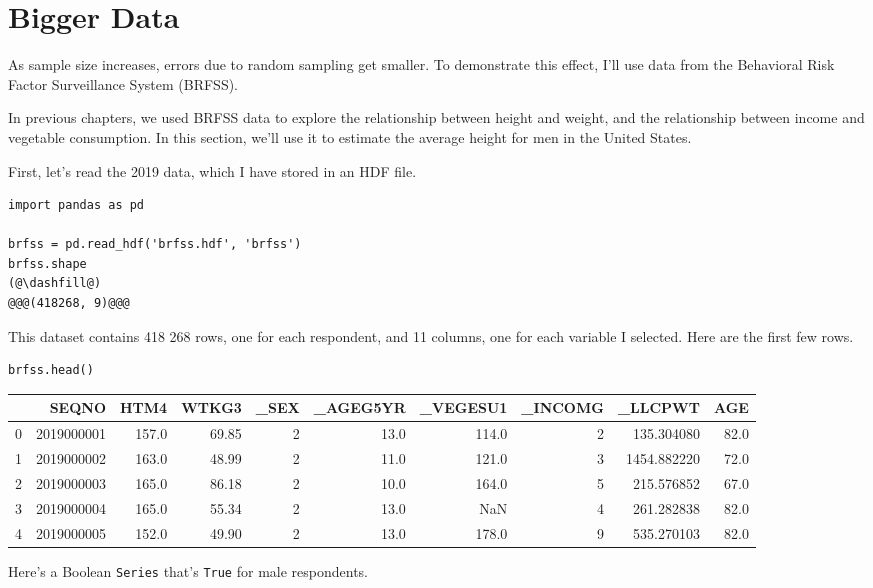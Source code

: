 \hypertarget{bigger-data}{%
\section{Bigger Data}\label{bigger-data}}

As sample size increases, errors due to random sampling get smaller. To
demonstrate this effect, I'll use data from the Behavioral Risk Factor
Surveillance System (BRFSS).

In previous chapters, we used BRFSS data to explore the relationship
between height and weight, and the relationship between income and
vegetable consumption. In this section, we'll use it to estimate the
average height for men in the United States.

First, let's read the 2019 data, which I have stored in an HDF file.

\begin{lstlisting}[]
import pandas as pd

brfss = pd.read_hdf('brfss.hdf', 'brfss')
brfss.shape
(@\dashfill@)
@@@(418268, 9)@@@
\end{lstlisting}

This dataset contains 418 268 rows, one for each respondent, and 11
columns, one for each variable I selected. Here are the first few rows.

\begin{lstlisting}[]
brfss.head()
\end{lstlisting}

\begin{tabular}{lrrrrrrrrr}
\midrule
{} &       SEQNO &   HTM4 &  WTKG3 &  \_SEX &  \_AGEG5YR &  \_VEGESU1 &  \_INCOMG &      \_LLCPWT &   AGE \\
\midrule
0 &  2019000001 &  157.0 &  69.85 &     2 &      13.0 &     114.0 &        2 &   135.304080 &  82.0 \\
1 &  2019000002 &  163.0 &  48.99 &     2 &      11.0 &     121.0 &        3 &  1454.882220 &  72.0 \\
2 &  2019000003 &  165.0 &  86.18 &     2 &      10.0 &     164.0 &        5 &   215.576852 &  67.0 \\
3 &  2019000004 &  165.0 &  55.34 &     2 &      13.0 &       NaN &        4 &   261.282838 &  82.0 \\
4 &  2019000005 &  152.0 &  49.90 &     2 &      13.0 &     178.0 &        9 &   535.270103 &  82.0 \\
\midrule
\end{tabular}

Here's a Boolean \passthrough{\lstinline!Series!} that's
\passthrough{\lstinline!True!} for male respondents.

